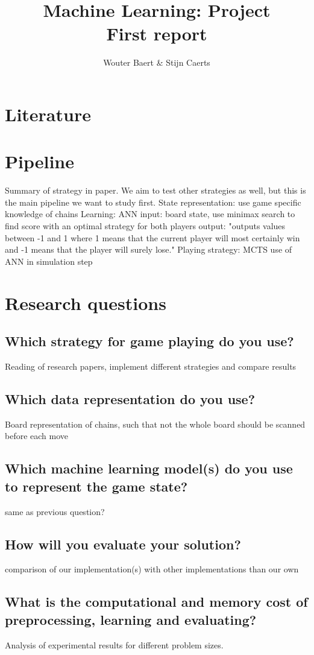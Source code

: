 \documentclass[11pt,a4paper]{article}
\author{Wouter Baert \& Stijn Caerts}
\title{Machine Learning: Project \\ \small{First report}}
\begin{document}
	\maketitle
	\section{Literature}
	
	\section{Pipeline}
	Summary of strategy in paper. We aim to test other strategies as well, but this is the main pipeline we want to study first.
	State representation: use game specific knowledge of chains
	Learning: ANN
		input: board state, use minimax search to find score with an optimal strategy for both players
		output: "outputs values between -1 and 1 where 1 means that
		the current player will most certainly win and -1 means that
		the player will surely lose."
	Playing strategy: MCTS
		use of ANN in simulation step
	\section{Research questions}
	\subsection{Which strategy for game playing do you use?}
	Reading of research papers, implement different strategies and compare results
	\subsection{Which data representation do you use?}
	Board representation of chains, such that not the whole board should be scanned before each move
	\subsection{Which machine learning model(s) do you use to represent the game state?}
	same as previous question?
	\subsection{How will you evaluate your solution?}
	comparison of our implementation(s) with other implementations than our own
	
	\subsection{What is the computational and memory cost of preprocessing, learning and evaluating?}
	Analysis of experimental results for different problem sizes.
	
\end{document}
